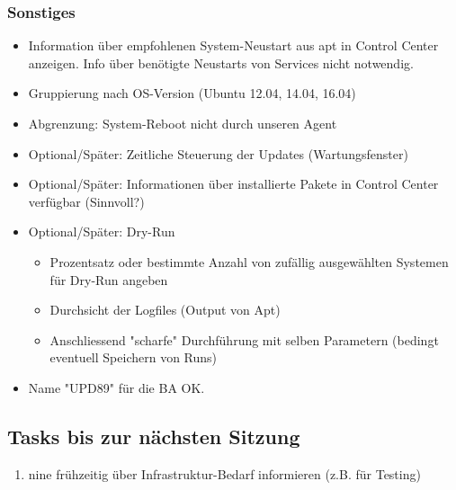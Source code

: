 \documentclass[class=scrbook,crop=false]{standalone}
\begin{document}
    \subsubsection{Sonstiges}
    
    \begin{itemize}
        \item Information über empfohlenen System-Neustart aus apt in Control Center anzeigen. Info über benötigte Neustarts von Services nicht notwendig.
        \item Gruppierung nach OS-Version (Ubuntu 12.04, 14.04, 16.04)
        \item Abgrenzung: System-Reboot nicht durch unseren Agent
        \item Optional/Später: Zeitliche Steuerung der Updates (Wartungsfenster)
        \item Optional/Später: Informationen über installierte Pakete in Control Center verfügbar (Sinnvoll?)
        \item Optional/Später: Dry-Run
        \begin{itemize}
            \item Prozentsatz oder bestimmte Anzahl von zufällig ausgewählten Systemen für Dry-Run angeben
            \item Durchsicht der Logfiles (Output von Apt)
            \item Anschliessend "scharfe" Durchführung mit selben Parametern (bedingt eventuell Speichern von Runs)
        \end{itemize}
        \item Name "UPD89" für die BA OK.
    \end{itemize}
    
    \subsection*{Tasks bis zur nächsten Sitzung}
    
    \begin{enumerate}
        \item nine frühzeitig über Infrastruktur-Bedarf informieren (z.B. für Testing)
    \end{enumerate}
\end{document}
